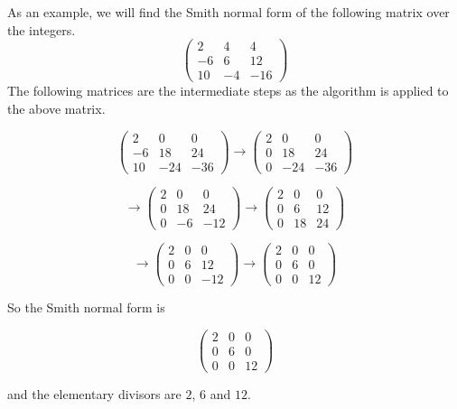 \documentclass[12pt]{article}
\begin{document}
As an example, we will find the Smith normal form of the following matrix over the integers.
\begin{equation*}
\left(\begin{array}{ccc}
2  & 4  & 4  \\
-6 & 6  & 12 \\
10 & -4 & -16
\end{array}\right)
\end{equation*}
The following matrices are the intermediate steps as the algorithm is applied to the above matrix.

\begin{equation*}
\left(\begin{array}{ccc}
2  & 0  & 0  \\
-6 & 18 & 24 \\
10 & -24& -36
\end{array}\right)
\to
\left(\begin{array}{ccc}
2  & 0  & 0  \\
0  & 18 & 24 \\
0  & -24& -36
\end{array}\right)
\end{equation*}

\begin{equation*}
\to
\left(\begin{array}{ccc}
2  & 0  & 0  \\
0  & 18 & 24 \\
0  & -6 & -12
\end{array}\right)
\to
\left(\begin{array}{ccc}
2  & 0  & 0  \\
0  & 6  & 12 \\
0  & 18 & 24
\end{array}\right)
\end{equation*}

\begin{equation*}
\to
\left(\begin{array}{ccc}
2  & 0  & 0  \\
0  & 6  & 12 \\
0  & 0  & -12
\end{array}\right)
\to
\left(\begin{array}{ccc}
2  & 0  & 0  \\
0  & 6  & 0  \\
0  & 0  & 12
\end{array}\right)
\end{equation*}

So the Smith normal form is

\begin{equation*}
\left(\begin{array}{ccc}
2  & 0  & 0  \\
0  & 6  & 0  \\
0  & 0  & 12
\end{array}\right)
\end{equation*}

and the elementary divisors are $2$, $6$ and $12$.
\end{document}

